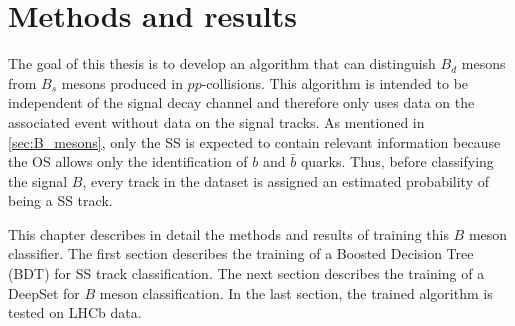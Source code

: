 \chapter{Methods and results}


The goal of this thesis is to develop an algorithm that can distinguish $B_d$ mesons from $B_s$ mesons produced in $pp$-collisions.
This algorithm is intended to be independent of the signal decay channel and therefore only uses data on the associated event without data on the signal tracks.
As mentioned in \autoref{sec:B_mesons}, only the SS is expected to contain relevant information because the OS allows only the identification of $b$ and $\bar{b}$ quarks.
Thus, before classifying the signal $B$, every track in the dataset is assigned an estimated probability of being a SS track.

This chapter describes in detail the methods and results of training this $B$ meson classifier.
The first section describes the training of a Boosted Decision Tree (BDT) for SS track classification.
The next section describes the training of a DeepSet for $B$ meson classification.
In the last section, the trained algorithm is tested on LHCb data.




